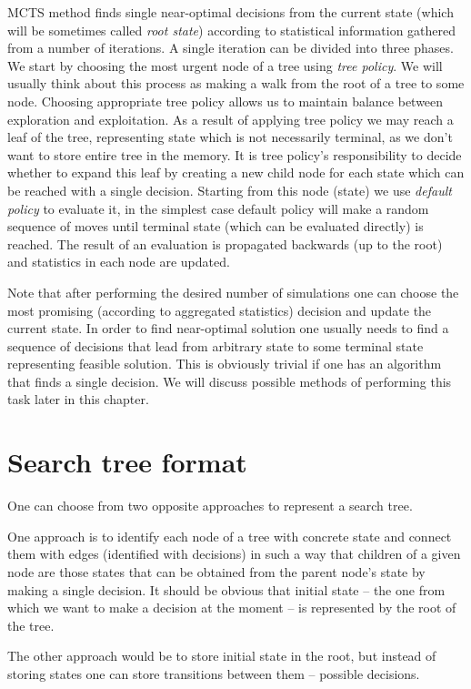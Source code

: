 MCTS method finds single near-optimal decisions from the current state (which
will be sometimes called \emph{root state}) according to statistical
information gathered from a number of iterations. A single iteration can be
divided into three phases.
We start by choosing the most urgent node of a tree using \emph{tree policy}.
We will usually think about this process as making a walk from the root of a
tree to some node. Choosing appropriate tree policy allows us to maintain
balance between exploration and exploitation.
As a result of applying tree policy we may reach a leaf of the tree,
representing state which is not necessarily terminal, as we don't want to store
entire tree in the memory. It is tree policy's responsibility to decide whether
to expand this leaf by creating a new child node for each state which can be
reached with a single decision.
Starting from this node (state) we use \emph{default policy} to evaluate it, in
the simplest case default policy will make a random sequence of moves until
terminal state (which can be evaluated directly) is reached.
The result of an evaluation is propagated backwards (up to the root) and statistics
in each node are updated.

Note that after performing the desired number of simulations one can choose the
most promising (according to aggregated statistics) decision and update the
current state. In order to find near-optimal solution one usually needs to find
a sequence of decisions that lead from arbitrary state to some terminal state
representing feasible solution. This is obviously trivial if one has an
algorithm that finds a single decision. We will discuss possible methods of
performing this task later in this chapter.

\section{Search tree format}
One can choose from two opposite approaches to represent a search tree.

One approach is to identify each node of a tree with concrete state and connect
them with edges (identified with decisions) in such a way that children of a
given node are those states that can be obtained from the parent node's state by
making a single decision. It should be obvious that initial state -- the one from
which we want to make a decision at the moment -- is represented by the root of
the tree.

The other approach would be to store initial state in the root, but instead of
storing states one can store transitions between them -- possible decisions.

